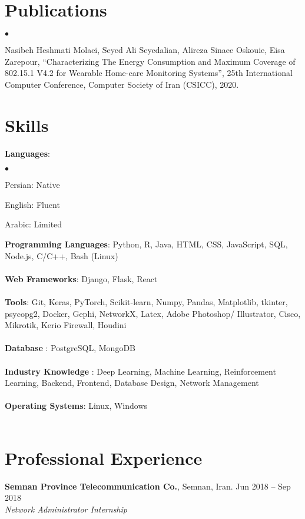 \documentclass[margin,line]{res}
\newenvironment{list2}{
  \begin{list}{$\bullet$}{%
      \setlength{\itemsep}{0in}
      \setlength{\parsep}{0in} \setlength{\parskip}{0in}
      \setlength{\topsep}{0in} \setlength{\partopsep}{0in}
      \setlength{\leftmargin}{0.2in}}}{\end{list}}
\begin{document}
\begin{resume}
\section{\sc Publications}
\begin{list2}
	\item Nasibeh Heshmati Molaei, Seyed Ali Seyedalian, Alireza Sinaee Oskouie, Eisa Zarepour, “Characterizing
	The Energy Consumption and Maximum Coverage of 802.15.1 V4.2 for Wearable Home-care Monitoring
	Systems”, 25th International Computer Conference, Computer Society of Iran (CSICC), 2020.
\end{list2}

\section{\sc Skills}
{\bf Languages}:
\begin{list2} 
	\item  Persian: Native 
	\item English: Fluent
	\item Arabic: Limited 
\end{list2}

{\bf Programming  Languages}:  
Python, R, Java, HTML, CSS, JavaScript,  SQL, Node.js, C/C++, Bash (Linux)\\ \\ 
{\bf Web Frameworks}: 
Django, Flask, React\\ \\
{\bf Tools}: 
Git, Keras, PyTorch, Scikit-learn, Numpy, Pandas, Matplotlib, tkinter, psycopg2, Docker,  Gephi, NetworkX,  Latex, Adobe Photoshop/ Illustrator, Cisco, Mikrotik, Kerio Firewall, Houdini \\ \\
{\bf Database }: PostgreSQL, MongoDB \\ \\ 
{\bf Industry Knowledge} : Deep Learning, Machine Learning, Reinforcement Learning, Backend, Frontend, Database Design, Network Management\\ \\
{\bf Operating Systems}: 
Linux, Windows\\ \\

\section{\sc Professional Experience}
{\bf Semnan Province Telecommunication Co.}, Semnan, Iran. \hfill{Jun 2018 -- Sep 2018}\\
{\em Network Administrator Internship }\\


\end{resume}
\end{document}
